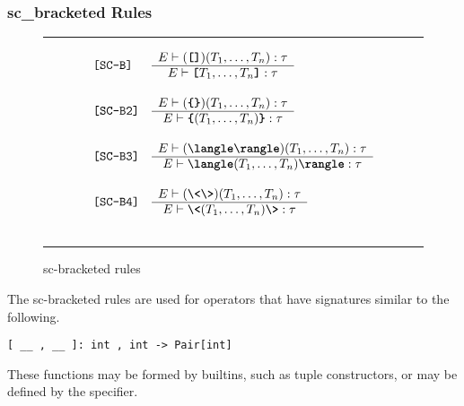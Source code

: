 \documentclass[12pt]{article} %
\newcommand{\reserved}[1]{\textbf{\texttt{#1}}} %
\newcommand{\RULELAB}[1]{\texttt{#1}}
\newcommand{\UNSPACEFORBOX}{\vspace{-2ex}}
\newcommand{\HLINE}{\UNSPACEFORBOX%
\begin{flushleft}\rule{\textwidth}{0.01in}\end{flushleft}%
\UNSPACEFORBOX}
\newenvironment{BFIGURE}{

\begin{figure}
\small
\HLINE
}{
\HLINE
\normalsize
\end{figure}
}
\begin{document}
\subsubsection{sc\_bracketed Rules}
\label{scbrules}
\begin{BFIGURE}
\begin{displaymath}
\begin{array}{llc}
\RULELAB{[SC-B]} &
\begin{array}{c}
E \vdash (\mbox{\reserved{[]}})(T_1,\dots,T_n):\tau \\
\hline
E \vdash \mbox{\reserved{[}}T_1,\dots,T_n\mbox{\reserved{]}}:\tau
\end{array}
\\
~\\
\RULELAB{[SC-B2]} &
\begin{array}{c}
E \vdash (\mbox{\reserved{\{\}}})(T_1,\dots,T_n):\tau\\
\hline
E \vdash \mbox{\reserved{\{}} (T_1,\dots,T_n) \mbox{\reserved{\}}}:\tau
\end{array}
\\
~\\
\RULELAB{[SC-B3]} &
\begin{array}{c}
E \vdash (\verb|\|\mbox{\reserved{langle}}\verb|\|\mbox{\reserved{rangle}})(T_1,\dots,T_n):\tau\\
\hline
E \vdash \verb|\|\mbox{\reserved{langle}} (T_1,\dots,T_n) \verb|\|\mbox{\reserved{rangle}}:\tau
\end{array}
\\
~\\
\RULELAB{[SC-B4]} &
\begin{array}{c}
E \vdash (\verb|\|\mbox{\reserved{<}}\verb|\|\mbox{\reserved{>}})(T_1,\dots,T_n):\tau\\
\hline
E \vdash \verb|\|\mbox{\reserved{<}} (T_1,\dots,T_n) \verb|\|\mbox{\reserved{>}}:\tau
\end{array}
\\
~\\
\end{array}
\end{displaymath}
\caption{sc-bracketed rules}
\label{fig-bracket}
\end{BFIGURE}

The sc-bracketed rules are used for operators that have signatures
similar to the following.
\begin{verbatim}
[ __ , __ ]: int , int -> Pair[int]
\end{verbatim}
These functions may be formed by builtins, such as
tuple constructors, or may be defined by the specifier.
\end{document}
